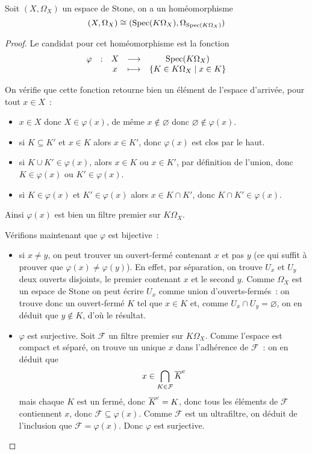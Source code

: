 \begin{lemma}
  Soit $(X,\Omega_X)$ un espace de Stone, on a un homéomorphisme
  \[(X,\Omega_X)\cong (\operatorname{Spec}(K\Omega_X),\Omega_{\operatorname{Spec}(K\Omega_X)})\]
\end{lemma}

\begin{proof}
  Le candidat pour cet homéomorphisme est la fonction
  \[\begin{array}{ccccc}
  \varphi & : & X & \longrightarrow & \operatorname{Spec}(K\Omega_X)\\
  & & x & \longmapsto & \{K \in K\Omega_X\mid x \in K\}
  \end{array}\]

  On vérifie que cette fonction retourne bien un élément de l'espace d'arrivée,
  pour tout $x\in X$~:
  \begin{itemize}
  \item $x\in X$ donc $X\in \varphi(x)$, de même $x\notin\varnothing$ donc
    $\varnothing\notin\varphi(x)$.
  \item si $K\subseteq K'$ et $x\in K$ alors $x\in K'$, donc $\varphi(x)$ est
    clos par le haut.
  \item si $K\cup K' \in \varphi(x)$, alors $x\in K$ ou $x\in K'$, par
    définition de l'union, donc $K\in\varphi(x)$ ou $K'\in\varphi(x)$.
  \item si $K\in\varphi(x)$ et $K'\in\varphi(x)$ alors $x\in K\cap K'$, donc
    $K\cap K'\in\varphi(x)$.
  \end{itemize}
  Ainsi $\varphi(x)$ est bien un filtre premier sur $K\Omega_X$.

  Vérifions maintenant que $\varphi$ est bijective~:
  \begin{itemize}
  \item si $x\neq y$, on peut trouver un ouvert-fermé contenant $x$ et pas $y$
    (ce qui suffit à prouver que $\varphi(x)\neq\varphi(y)$). En effet, par
    séparation, on trouve $U_x$ et $U_y$ deux ouverts disjoints, le premier
    contenant $x$ et le second $y$. Comme $\Omega_X$ est un espace de Stone on
    peut écrire $U_x$ comme union d'ouverts-fermés~: on trouve donc un
    ouvert-fermé $K$ tel que $x\in K$ et, comme $U_x\cap U_y=\varnothing$, on
    en déduit que $y\notin K$, d'où le résultat.
  \item $\varphi$ est surjective. Soit $\mathcal F$ un filtre premier sur
    $K\Omega_X$. Comme l'espace est compact et séparé, on trouve un unique
    $x$ dans l'adhérence de $\mathcal F$~: on en déduit que
    \[x\in\bigcap_{K\in \mathcal F}\overline{K}^{\mathrm c}\]
    mais chaque $K$ est un fermé, donc $\overline{K}^{\mathrm c} = K$, donc tous les éléments
    de $\mathcal F$ contiennent $x$, donc $\mathcal F\subseteq \varphi(x)$.
    Comme $\mathcal F$ est un ultrafiltre, on déduit de l'inclusion que
    $\mathcal F = \varphi(x)$. Donc $\varphi$ est surjective.
  \end{itemize}


\end{proof}
